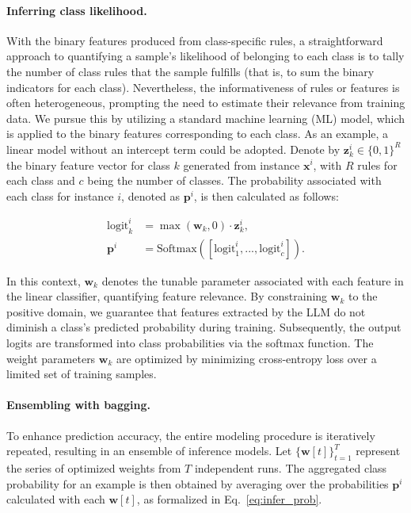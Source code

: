 \paragraph{Inferring class likelihood.} With the binary features produced from class-specific rules, a straightforward approach to quantifying a sample's likelihood of belonging to each class is to tally the number of class rules that the sample fulfills (that is, to sum the binary indicators for each class). Nevertheless, the informativeness of rules or features is often heterogeneous, prompting the need to estimate their relevance from training data. We pursue this by utilizing a standard machine learning (ML) model, which is applied to the binary features corresponding to each class. As an example, a linear model without an intercept term could be adopted. Denote by $\mathbf{z}_k^i \in \{0, 1\}^R$ the binary feature vector for class $k$ generated from instance $\mathbf{x}^i$, with $R$ rules for each class and $c$ being the number of classes. The probability associated with each class for instance $i$, denoted as $\mathbf{p}^i$, is then calculated as follows:

\begin{align}
\text{logit}_k^i &= \max(\mathbf{w}_k, 0) \cdot \mathbf{z}_k^i, \nonumber \\
\mathbf{p}^i &= \text{Softmax}({[\text{logit}_{1}^i, ..., \text{logit}_{c}^i]}). \label{eq:infer_prob}
\end{align}

In this context, $\mathbf{w}_k$ denotes the tunable parameter associated with each feature in the linear classifier, quantifying feature relevance. By constraining $\mathbf{w}_k$ to the positive domain, we guarantee that features extracted by the LLM do not diminish a class’s predicted probability during training. Subsequently, the output logits are transformed into class probabilities via the softmax function. The weight parameters $\mathbf{w}_k$ are optimized by minimizing cross-entropy loss over a limited set of training samples.

\vspace*{-0.12in}
\paragraph{Ensembling with bagging.} To enhance prediction accuracy, the entire modeling procedure is iteratively repeated, resulting in an ensemble of inference models. Let $\{\mathbf{w}[t]\}_{t=1}^T$ represent the series of optimized weights from $T$ independent runs. The aggregated class probability for an example is then obtained by averaging over the probabilities $\mathbf{p}^i$ calculated with each $\mathbf{w}[t]$, as formalized in Eq.~\ref{eq:infer_prob}.

